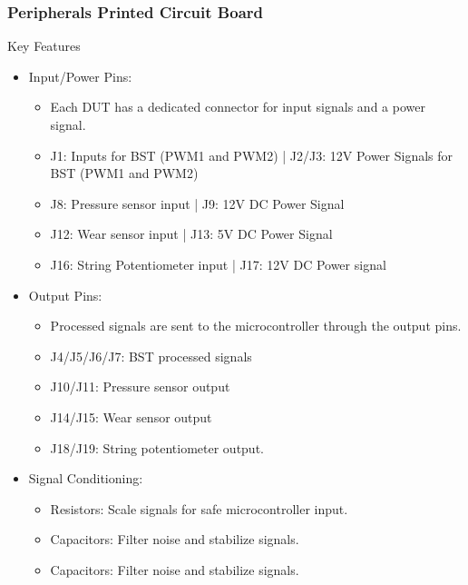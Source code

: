 \documentclass[8pt,compress]{beamer}
\begin{document}
\begin{frame}
  \frametitle{Peripherals Printed Circuit Board}
  \begin{minipage}{0.5\textwidth}
    \begin{block}{Key Features}
      \begin{itemize}
          \small
        \item Input/Power Pins:
          \begin{itemize}
              \footnotesize
            \item Each DUT has a dedicated connector for input signals and a power signal.
            \item J1: Inputs for BST (PWM1 and PWM2) | J2/J3: 12V Power Signals for BST (PWM1 and PWM2)
            \item J8: Pressure sensor input | J9: 12V DC Power Signal
            \item J12: Wear sensor input | J13: 5V DC Power Signal
            \item J16: String Potentiometer input | J17: 12V DC Power signal
          \end{itemize}
        \item Output Pins:
          \begin{itemize}
              \footnotesize
            \item Processed signals are sent to the microcontroller through the output pins.
            \item J4/J5/J6/J7: BST processed signals
            \item J10/J11: Pressure sensor output
            \item J14/J15: Wear sensor output
            \item J18/J19: String potentiometer output.
          \end{itemize}
        \item Signal Conditioning:
          \begin{itemize}
              \footnotesize
            \item Resistors: Scale signals for safe microcontroller input.
            \item Capacitors: Filter noise and stabilize signals.
            \item Capacitors: Filter noise and stabilize signals.
          \end{itemize}
      \end{itemize}
    \end{block}
  \end{minipage}

\end{frame}
\end{document}
